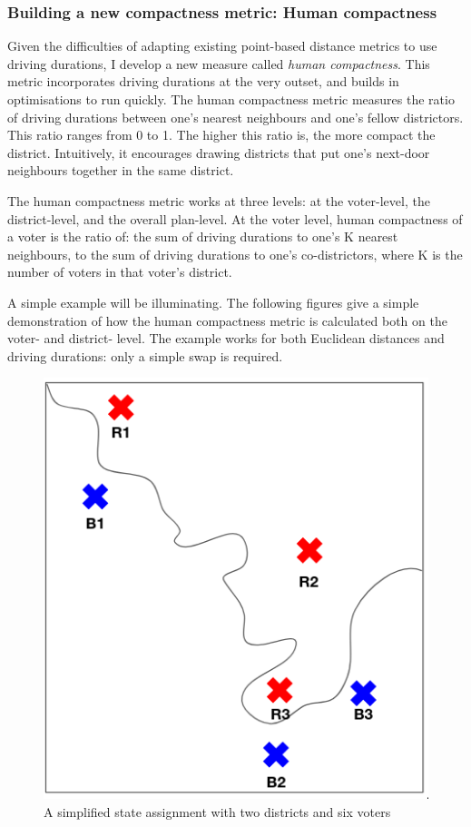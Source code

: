 \documentclass[]{article}
\begin{document}
\hypertarget{building-a-new-compactness-metric-human-compactness}{%
\subsubsection{Building a new compactness metric: Human
compactness}\label{building-a-new-compactness-metric-human-compactness}}

Given the difficulties of adapting existing point-based distance metrics
to use driving durations, I develop a new measure called \emph{human
compactness}. This metric incorporates driving durations at the very
outset, and builds in optimisations to run quickly. The human
compactness metric measures the ratio of driving durations between one's
nearest neighbours and one's fellow districtors. This ratio ranges from
0 to 1. The higher this ratio is, the more compact the district.
Intuitively, it encourages drawing districts that put one's next-door
neighbours together in the same district.

The human compactness metric works at three levels: at the voter-level,
the district-level, and the overall plan-level. At the voter level,
human compactness of a voter is the ratio of: the sum of driving
durations to one's K nearest neighbours, to the sum of driving durations
to one's co-districtors, where K is the number of voters in that voter's
district.

A simple example will be illuminating. The following figures give a
simple demonstration of how the human compactness metric is calculated
both on the voter- and district- level. The example works for both
Euclidean distances and driving durations: only a simple swap is
required.

\begin{figure}
\centering
\includegraphics{img/human_compactness_1.png}
\caption{A simplified state assignment with two districts and six voters
\label{hc_demo}}
\end{figure}
\end{document}
